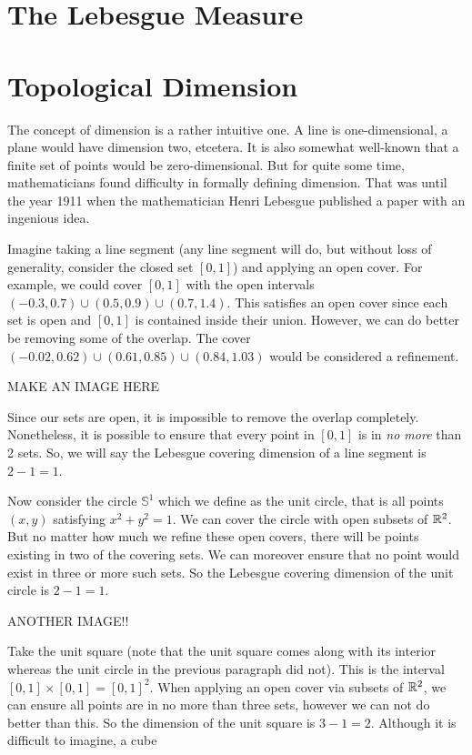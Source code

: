 \section{The Lebesgue Measure}
\Blindtext

\section{Topological Dimension}
The concept of dimension is a rather intuitive one. A line is one-dimensional, a plane would have dimension two, etcetera. It is also somewhat well-known that a finite set of points would be zero-dimensional. But for quite some time, mathematicians found difficulty in formally defining dimension. That was until the year 1911 when the mathematician Henri Lebesgue published a paper with an ingenious idea. \par

Imagine taking a line segment (any line segment will do, but without loss of generality, consider the closed set $[0,1]$) and applying an open cover. For example, we could cover $[0,1]$ with the open intervals $(-0.3,0.7)\cup (0.5, 0.9)\cup (0.7,1.4)$. This satisfies an open cover since each set is open and $[0,1]$ is contained inside their union. However, we can do better be removing some of the overlap. The cover $(-0.02,0.62)\cup(0.61,0.85)\cup(0.84,1.03)$ would be considered a refinement. \par

MAKE AN IMAGE HERE\par

Since our sets are open, it is impossible to remove the overlap completely. Nonetheless, it is possible to ensure that every point in $[0,1]$ is in \textit{no more} than 2 sets. So, we will say the Lebesgue covering dimension of a line segment is $2-1=1$. \par


Now consider the circle $\mathbb{S}^1$ which we define as the unit circle, that is all points $(x,y)$ satisfying $x^2+y^2=1$. We can cover the circle with open subsets of $\mathbb{R}^2$. But no matter how much we refine these open covers, there will be points existing in two of the covering sets. We can moreover ensure that no point would exist in three or more such sets. So the Lebesgue covering dimension of the unit circle is $2-1=1$. \par

ANOTHER IMAGE!!\par

Take the unit square (note that the unit square comes along with its interior whereas the unit circle in the previous paragraph did not). This is the interval $[0,1]\times[0,1]=[0,1]^2$. When applying an open cover via subsets of $\mathbb{R}^2$, we can ensure all points are in no more than three sets, however we can not do better than this. So the dimension of the unit square is $3-1=2$. Although it is difficult to imagine, a cube  \par


